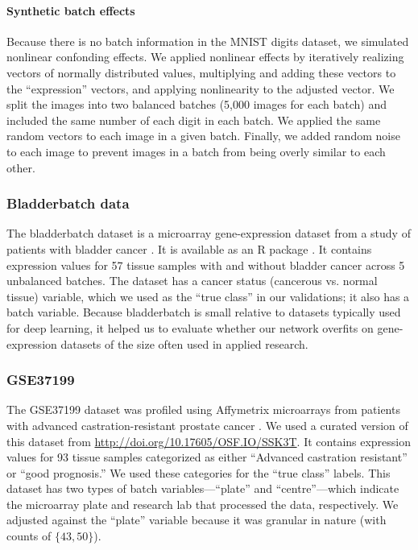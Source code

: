 \documentclass[11pt]{article}
\begin{document}
\paragraph{Synthetic batch effects}

Because there is no batch information in the MNIST digits dataset, we simulated nonlinear confonding effects.
We applied nonlinear effects by iteratively realizing vectors of normally distributed values, multiplying and adding these vectors to the ``expression'' vectors, and applying nonlinearity to the adjusted vector.
We split the images into two balanced batches (5,000 images for each batch) and included the same number of each digit in each batch.
We applied the same random vectors to each image in a given batch.
Finally, we added random noise to each image to prevent images in a batch from being overly similar to each other.

\subsubsection{Bladderbatch data}

The bladderbatch dataset is a microarray gene-expression dataset from a study of patients with bladder cancer \cite{dyrskjot_gene_2004}.
It is available as an R package \cite{leek_bladderbatch_2017}.
It contains expression values for 57 tissue samples with and without bladder cancer across 5 unbalanced batches.
The dataset has a cancer status (cancerous vs. normal tissue) variable, which we used as the ``true class'' in our validations; it also has a batch variable.
Because bladderbatch is small relative to datasets typically used for deep learning, it helped us to evaluate whether our network overfits on gene-expression datasets of the size often used in applied research.

\subsubsection{GSE37199}

The GSE37199 dataset was profiled using Affymetrix microarrays from patients with advanced castration-resistant prostate cancer \cite{olmos_prognostic_2012}.
We used a curated version of this dataset from \url{http://doi.org/10.17605/OSF.IO/SSK3T}\cite{golightly_curated_2018}.
It contains expression values for 93 tissue samples categorized as either ``Advanced castration resistant'' or ``good prognosis.''
We used these categories for the ``true class'' labels.
This dataset has two types of batch variables---``plate'' and ``centre''---which indicate the microarray plate and research lab that processed the data, respectively.
We adjusted against the ``plate'' variable because it was granular in nature (with counts of $\{43, 50\}$).
\end{document}

